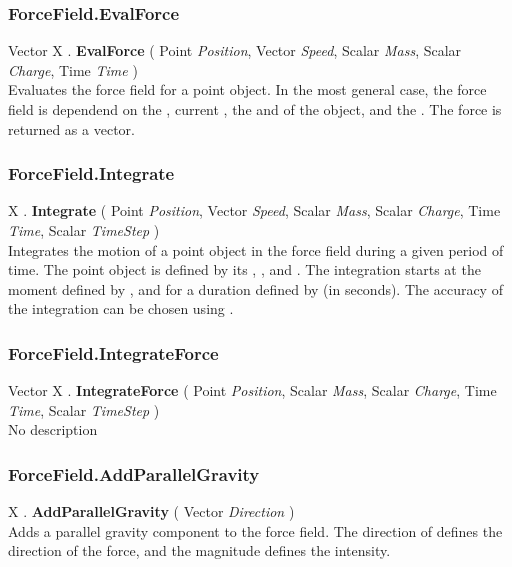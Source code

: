 \subsubsection{ForceField.EvalForce \label{F:ForceField:EvalForce}}
Vector X . \textbf{EvalForce} ( Point \textit{Position}, Vector \textit{Speed}, Scalar \textit{Mass}, Scalar \textit{Charge}, Time \textit{Time} ) \\
Evaluates the force field for a point object. In the most general case, the force field is dependend on the , current , the  and  of the object, and the . The force is returned as a vector.

\subsubsection{ForceField.Integrate \label{F:ForceField:Integrate}}
X . \textbf{Integrate} ( Point \textit{Position}, Vector \textit{Speed}, Scalar \textit{Mass}, Scalar \textit{Charge}, Time \textit{Time}, Scalar \textit{TimeStep} ) \\
Integrates the motion of a point object in the force field during a given period of time. The point object is defined by its , ,  and . The integration starts at the moment defined by , and for a duration defined by  (in seconds). The accuracy of the integration can be chosen using .

\subsubsection{ForceField.IntegrateForce \label{F:ForceField:IntegrateForce}}
Vector X . \textbf{IntegrateForce} ( Point \textit{Position}, Scalar \textit{Mass}, Scalar \textit{Charge}, Time \textit{Time}, Scalar \textit{TimeStep} ) \\
No description

\subsubsection{ForceField.AddParallelGravity \label{F:ForceField:AddParallelGravity}}
X . \textbf{AddParallelGravity} ( Vector \textit{Direction} ) \\
Adds a parallel gravity component to the force field. The direction of  defines the direction of the force, and the magnitude defines the intensity.

